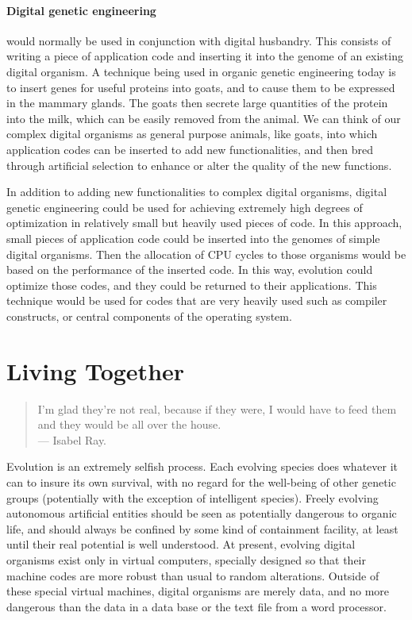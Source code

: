 \paragraph{Digital genetic engineering} would normally be used in
conjunction with digital husbandry.  This consists of writing a piece
of application code and inserting it into the genome of an existing
digital organism.  A technique being used in organic genetic engineering
today is to insert genes for useful proteins into goats, and to cause
them to be expressed in the mammary glands.  The goats then secrete
large quantities of the protein into the milk, which can be easily
removed from the animal.  We can think of our complex digital organisms
as general purpose animals, like goats, into which application codes
can be inserted to add new functionalities, and then bred through
artificial selection to enhance or alter the quality of the new functions.

In addition to adding new functionalities to complex digital organisms,
digital genetic engineering could be used for achieving extremely high
degrees of optimization in relatively small but heavily used pieces of
code.  In this approach, small pieces of application code could be
inserted into the genomes of simple digital organisms.  Then the
allocation of CPU cycles to those organisms would be based on the
performance of the inserted code.  In this way, evolution could optimize
those codes, and they could be returned to their applications.  This
technique would be used for codes that are very heavily used such as
compiler constructs, or central components of the operating system.

\section{Living Together}

\begin{quote}
I'm glad they're not real, because if they were, I would have to
feed them and they would be all over the house.\\
\hspace*{2in}--- Isabel Ray.
\end{quote}

Evolution is an extremely selfish process.  Each evolving species does
whatever it can to insure its own survival, with no regard for the
well-being of other genetic groups (potentially with the exception of
intelligent species).  Freely evolving autonomous artificial entities
should be seen as potentially dangerous to organic life, and should
always be confined by some kind of containment facility, at least until
their real potential is well understood.  At present, evolving digital
organisms exist only in virtual computers, specially designed so that
their machine codes are more robust than usual to random alterations.
Outside of these special virtual machines, digital organisms are merely
data, and no more dangerous than the data in a data base or the text
file from a word processor.

